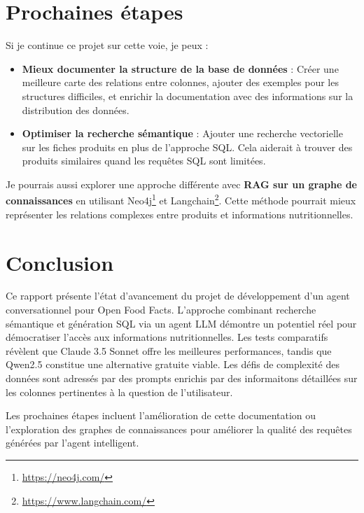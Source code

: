 \documentclass[a4paper,11pt]{article}
\begin{document}
\newpage
\section{Prochaines étapes}
\label{sec:next}

Si je continue ce projet sur cette voie, je peux :
\begin{itemize}
\item \textbf{Mieux documenter la structure de la base de données} : Créer une meilleure carte des relations entre colonnes, ajouter des exemples pour les structures difficiles, et enrichir la documentation avec des informations sur la distribution des données.
\item \textbf{Optimiser la recherche sémantique} : Ajouter une recherche vectorielle sur les fiches produits en plus de l'approche SQL. Cela aiderait à trouver des produits similaires quand les requêtes SQL sont limitées.
\end{itemize}

\vskip 0.1cm
Je pourrais aussi explorer une approche différente avec \textbf{RAG sur un graphe de connaissances} en utilisant Neo4j\footnote{\url{https://neo4j.com/}} et 
Langchain\footnote{\url{https://www.langchain.com/}}. Cette méthode pourrait mieux représenter les relations complexes entre produits et informations nutritionnelles.


\section{Conclusion}
\label{sec:conclusion}

Ce rapport présente l'état d'avancement du projet de développement d'un agent conversationnel pour Open Food Facts. L'approche combinant recherche sémantique et génération SQL via un agent LLM démontre un potentiel réel pour démocratiser l'accès aux informations nutritionnelles. Les tests comparatifs révèlent que Claude 3.5 Sonnet offre les meilleures performances, tandis que Qwen2.5 constitue une alternative gratuite viable. Les défis de complexité des données sont adressés par des prompts enrichis 
par des informaitons détaillées sur les colonnes pertinentes à la question de l'utilisateur.

Les prochaines étapes incluent l'amélioration de cette documentation ou l'exploration des graphes de connaissances pour améliorer la qualité des requêtes générées par l'agent intelligent.
\end{document}
